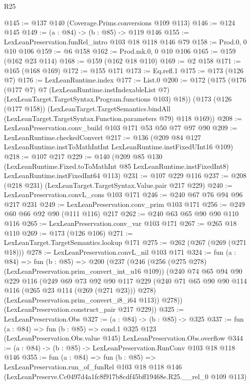 \begin{lexlean}{R25}
\begin{coremodule}
@145 := @137 @140 (Coverage.Prims.conversions @109 @113)
@146 := @124 @145
@149 := (a : @84) -> (b : @85) -> @119 @146
@155 := LexLeanPreservation.funRel_intro @103 @18 @118 @146 @79
@158 := Prod.{0, 0} @10 @106
@159 := @6 @158
@162 := Prod.mk.{0, 0} @10 @106
@165 := @159 (@162 @23 @114)
@168 := @159 (@162 @18 @110)
@169 := @2 @158
@171 := @165 (@168 @169)
@172 := @155 @171
@173 := Eq.refl.{1}
@175 := @173 (@126 @7)
@176 := LexLeanRuntime.index
@177 := List.{0}
@200 := @172
    (@175
      (@176
        (@177 @7)
        @7
        (LexLeanRuntime.instIndexableList @7)
        (LexLeanTarget.TargetSyntax.Program.functions @103)
        @18))
    (@173
      (@126 (@177 @158))
      (LexLeanTarget.TargetSemantics.bindAll
        (LexLeanTarget.TargetSyntax.Function.parameters @79)
        @118
        @169))
@208 := LexLeanPreservation.conv_build @103 @171 @53 @50 @77 @97 @90
@209 := LexLeanRuntime.checkedConvert
@217 := @136 (@209 @84 @127 LexLeanRuntime.instToMathIntInt LexLeanRuntime.instFixedUInt16 @109)
@218 := @107 @217
@229 := @140
    (@209
      @85
      @130
      (LexLeanRuntime.Fixed.toToMathInt @85 LexLeanRuntime.instFixedInt8)
      LexLeanRuntime.instFixedInt64
      @113)
@231 := @107 @229 @116
@237 := @208 (@218 @231) (LexLeanTarget.TargetSyntax.Value.pair @217 @229)
@240 := LexLeanPreservation.convL_cons @103 @171
@246 := @240 @67 @76 @94 @96 @217 @231
@249 := LexLeanPreservation.conv_prim @103 @171
@256 := @249 @60 @66 @92 @90 (@111 @116) @217
@262 := @240 @63 @65 @90 @90 @110 @116
@265 := LexLeanPreservation.conv_var @103 @171
@267 := @265 @18 @110
@269 := @173 (@126 @106)
@271 := LexLeanTarget.TargetSemantics.lookup @171
@275 := @262 (@267 (@269 (@271 @18)))
@278 := LexLeanPreservation.convL_nil @103 @171
@324 := fun (a : @84) =>
  fun (b : @85) =>
  @200
    (@237
      (@246
        (@256 (@275 @278) (LexLeanPreservation.prim_convert_int_u16 @109))
        (@240
          @74
          @65
          @94
          @90
          @229
          @116
          (@249
            @69
            @73
            @92
            @90
            @117
            @229
            (@240 @71 @65 @90 @90 @114 @116 (@265 @23 @114 (@269 (@271 @23))) @278)
            (LexLeanPreservation.prim_convert_i8_i64 @113))
          @278))
      (LexLeanPreservation.construct_pair @217 @229))
@325 := LexLeanPreservation.Obs
@327 := (a : @84) -> (b : @85) -> @325
@337 := fun (a : @84) =>
  fun (b : @85) =>
  cond.{1} @325 @123 (LexLeanPreservation.Obs.value @145) LexLeanPreservation.Obs.overflow
@344 := (a : @84) -> (b : @85) -> LexLeanPreservation.RunConv @103 @18 @118 @146
@355 := fun (a : @84) =>
  fun (b : @85) =>
  LexLeanPreservation.run_of_funRel
    @103
    @18
    @118
    @146
    (LexLeanPreserve.Cc0497d4a1fc8f917b8cdf45bff19468e.R25.__rel_0 @109 @113)
\end{coremodule}
\end{lexlean}
